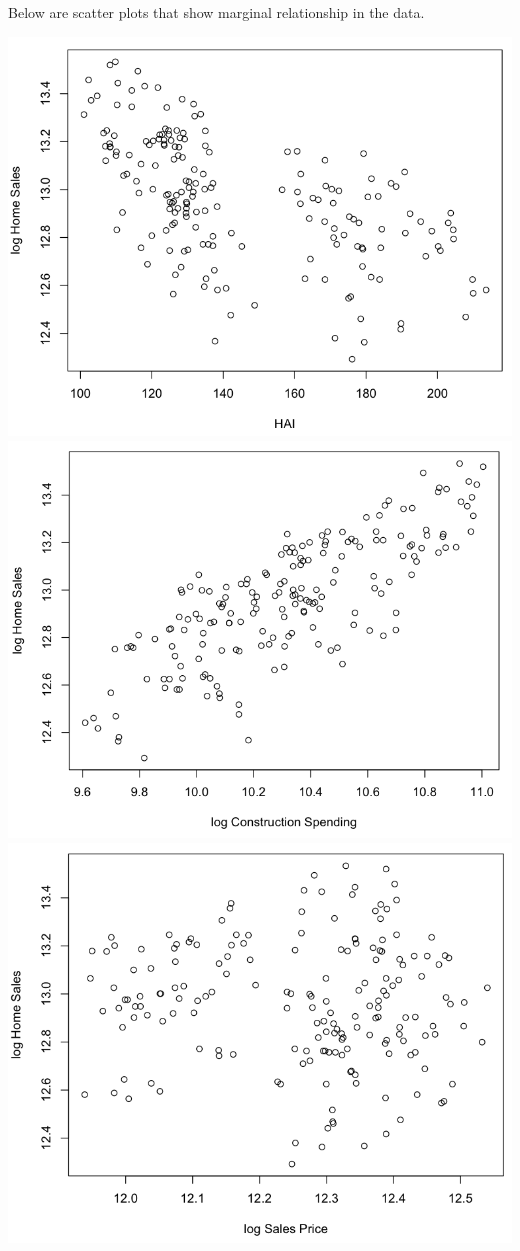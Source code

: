 \documentclass[a4 paper, 11 pt]{article}
\begin{document}
Below are scatter plots that show marginal relationship in the data.
\begin{center}
\includegraphics[scale=0.3]{HAI}
\includegraphics[scale=0.3]{cons}
\includegraphics[scale=0.3]{price}

\end{center}
\end{document}
